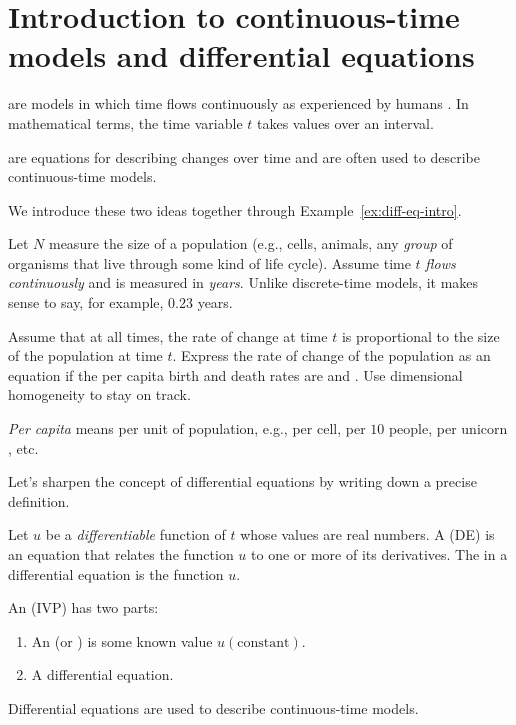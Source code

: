 \documentclass[../main.tex]{subfiles}
\begin{document}
 \section{Introduction to continuous-time models and differential equations}

 are models in which time flows continuously as experienced by humans . In mathematical terms, the time variable \(t\) takes values over an interval. 

 are equations for describing changes over time and are often used to describe continuous-time models.

We introduce these two ideas together through Example~\ref{ex:diff-eq-intro}.

\begin{example} \label{ex:diff-eq-intro}
  Let \(N\) measure the size of a population (e.g., cells, animals, any \emph{group} of organisms that live through some kind of life cycle). Assume time \(t\) \emph{flows continuously} and is measured in \emph{years}. Unlike discrete-time models, it makes sense to say, for example, \(0.23\) years.

  Assume that at all times, the rate of change at time \(t\) is proportional to the size of the population at time \(t\).  
  Express the rate of change of the population  as an equation if the per capita birth and death rates  are  and .
  Use dimensional homogeneity to stay on track.

  \emph{Per capita} means per unit of population, e.g., per cell, per \(10\) people, per unicorn {}, etc.  

  \blanks*
\end{example}
\clearpage

Let's sharpen the concept of differential equations by writing down a precise definition.
\begin{definition} \label{def:differential-equation}
  Let \(u\) be a \emph{differentiable} function of \(t\) whose values are real numbers. A  (DE) is an equation that relates the function \(u\) to one or more of its derivatives.  The  in a differential equation is the function \(u\).

  An  (IVP) has two parts:
  \begin{enumerate}
    \item An  (or ) is some known value \(u(\text{constant})\).
    \item A differential equation.
  \end{enumerate}

  \faExclamationTriangle{} Differential equations are used to describe continuous-time models.
\end{definition}
\end{document}
